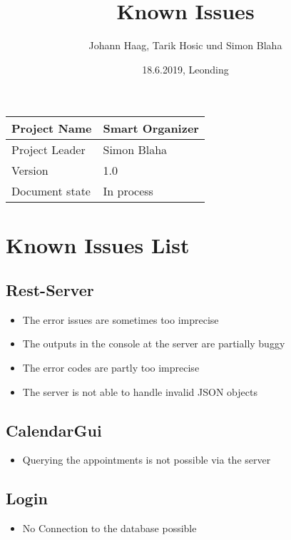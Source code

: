 \documentclass[12pt]{scrartcl}
\title{Known Issues}
\author{Johann Haag, Tarik Hosic und Simon Blaha}
\date{18.6.2019, Leonding}
\begin{document}
    \maketitle
    \begin{flushleft}
    \begin{tabular}{|l|l|}
    \hline
    Project Name & Smart Organizer \\ \hline
    Project Leader & Simon Blaha \\ \hline
    Version & 1.0\\ \hline
    Document state & In process \\ \hline
    \end{tabular}
    \end{flushleft}

    \pagebreak
    \tableofcontents
    \pagebreak

    \section{Known Issues List}
    \subsection{Rest-Server}
    \begin{itemize}
        \item The error issues are sometimes too imprecise
        \item The outputs in the console at the server are partially buggy
        \item The error codes are partly too imprecise
        \item The server is not able to handle invalid JSON objects 
    \end{itemize}

    \subsection{CalendarGui}
    \begin{itemize}
        \item Querying the appointments is not possible via the server
    \end{itemize}

    \subsection{Login}
    \begin{itemize}
        \item No Connection to the database possible
    \end{itemize}
\end{document}
